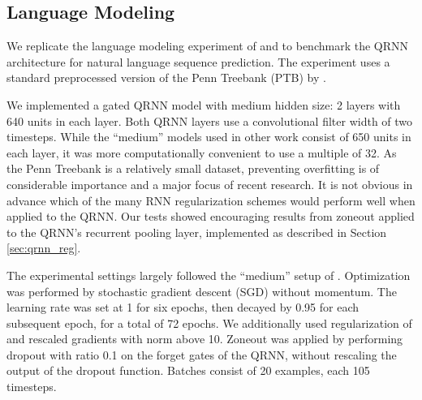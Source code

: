 \documentclass{article} \usepackage{iclr2017_conference,times}
\begin{document}
\subsection{Language Modeling}

We replicate the language modeling experiment of \citet{Zaremba2014} and \citet{Gal2015} to benchmark the QRNN architecture for natural language sequence prediction.
The experiment uses a standard preprocessed version of the Penn Treebank (PTB) by \citet{Mikolov2010}.

We implemented a gated QRNN model with medium hidden size: 2 layers with 640 units in each layer. Both QRNN layers use a convolutional filter width  of two timesteps.
While the ``medium'' models used in other work \citep{Zaremba2014,Gal2015} consist of 650 units in each layer, it was more computationally convenient to use a multiple of 32.
As the Penn Treebank is a relatively small dataset, preventing overfitting is of considerable importance and a major focus of recent research.
It is not obvious in advance which of the many RNN regularization schemes would perform well when applied to the QRNN.
Our tests showed encouraging results from zoneout applied to the QRNN's recurrent pooling layer, implemented as described in Section \ref{sec:qrnn_reg}.

The experimental settings largely followed the ``medium'' setup of \citet{Zaremba2014}.
Optimization was performed by stochastic gradient descent (SGD) without momentum. The learning rate was set at 1 for six epochs, then decayed by 0.95 for each subsequent epoch, for a total of 72 epochs.
We additionally used  regularization of  and rescaled gradients with norm above 10.
Zoneout was applied by performing dropout with ratio 0.1 on the forget gates of the QRNN, without rescaling the output of the dropout function.
Batches consist of 20 examples, each 105 timesteps.
\end{document}
